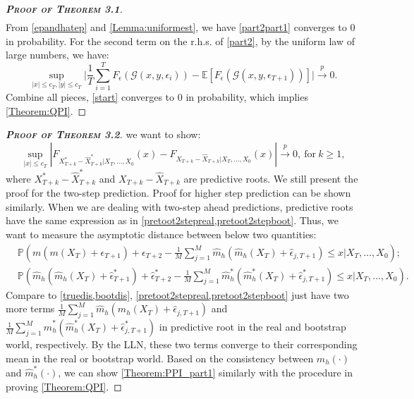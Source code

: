 \documentclass[a4paper]{article}
\begin{document}
\begin{proof}[\textbf{\textsc{Proof of Theorem 3.1}}]
\begin{equation}
\begin{split}
\end{split} 
\end{equation}
 From \cref{epandhatep} and \cref{Lemma:uniformest}, we have \cref{part2part1} converges to 0 in probability. For the second term on the r.h.s. of \cref{part2}, by the uniform law of large numbers, we have: 
 \begin{equation}
     \sup_{|x|\leq c_T, |y|\leq c_T}\bigg\vert \frac{1}{T}\sum_{i=1}^{T}F_{\epsilon}(\mathcal{G}(x,y,\epsilon_i)) - \mathbb{E}\left[F_{\epsilon}\left( \mathcal{G}(x,y,\epsilon_{T+1})   \right)\right]      \bigg\vert \overset{p}{\to} 0. 
 \end{equation}
 Combine all pieces, \cref{start} converges to 0 in probability, which implies \cref{Theorem:QPI}. 
 \end{proof}
\begin{proof}[\textbf{\textsc{Proof of Theorem 3.2}}]
we want to show:
\begin{equation}
    \sup_{|x|\leq c_{T}}\left| F_{X^*_{T+k}- \widehat{X}^*_{T+k}|X_T,\ldots,X_0}(x) -  F_{X_{T+k} - \widehat{X}_{T+k}|X_T,\ldots,X_0}(x)\right| \overset{p}{\to} 0,~\text{for}~k \geq 1,
\end{equation}
where $X^*_{T+k}- \widehat{X}^*_{T+k}$ and $X_{T+k} - \widehat{X}_{T+k}$ are predictive roots. We still present the proof for the two-step prediction. Proof for higher step prediction can be shown similarly. When we are dealing with two-step ahead predictions, predictive roots have the same expression as in \cref{pretoot2stepreal,pretoot2stepboot}. Thus, we want to measure the asymptotic distance between below two quantities:
\begin{equation}\label{ptwopreroot}
\begin{split}
    &\mathbb{P}\left(m(m(X_T)+\epsilon_{T+1}) + \epsilon_{T+2} - \frac{1}{M}\sum_{j=1}^{M} \widehat{m}_{h}\left(\widehat{m}_{h}(X_T)+\hat{\epsilon}_{j,T+1}\right)\leq x\bigg\vert X_{T},\ldots,X_{0}\right);\\
    &\mathbb{P}\left(\widehat{m}_{h}(\widehat{m}_{h}(X_T)+\hat{\epsilon}^*_{T+1}) + \hat{\epsilon}^*_{T+2} - \frac{1}{M}\sum_{j=1}^{M}  \widehat{m}^*_{h}\left(\widehat{m}^*_{h}(X_T)+\hat{\epsilon}^*_{j,T+1}\right)\leq x\bigg\vert X_{T},\ldots,X_{0}\right).
\end{split}
\end{equation}
Compare to \cref{truedis,bootdis}, \cref{pretoot2stepreal,pretoot2stepboot} just have two more terms $\frac{1}{M}\sum_{j=1}^{M} \widehat{m}_{h}\left(\widehat{m}_{h}(X_T)+\hat{\epsilon}_{j,T+1}\right)$ and $\frac{1}{M}\sum_{j=1}^{M}  \widehat{m}^*_{h}\left(\widehat{m}^*_{h}(X_T)+\hat{\epsilon}^*_{j,T+1}\right)$ in predictive root in the real and bootstrap world, respectively. By the LLN, these two terms converge to their corresponding mean in the real or bootstrap world. Based on the consistency between $\widehat{m}_{h}(\cdot)$ and $\widehat{m}^*_{h}(\cdot)$, we can show \cref{Theorem:PPI_part1} similarly with the procedure in proving \cref{Theorem:QPI}. 
 \end{proof}
 
\end{document}
